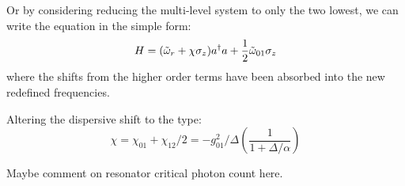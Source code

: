 Or by considering reducing the multi-level system to only the two lowest, we can write the equation in the simple form:
\begin{equation}\label{eq:two_level_qubit_dispersive}
    H = (\Tilde{\omega}_r + \chi \sigma_z) a^\dagger a + \frac12 \Tilde{\omega}_{01} \sigma_z
\end{equation}
where the shifts from the higher order terms have been absorbed into the new redefined frequencies. 

Altering the dispersive shift to the type\cite{krantz_quantum_2019}: 
\begin{equation}
    \chi = \chi_{01} + \chi_{12}/2 = - g_{01}^2/\Delta \left(\frac{1}{1 + \Delta / \alpha}\right)
\end{equation}

Maybe comment on resonator critical photon count here. 


